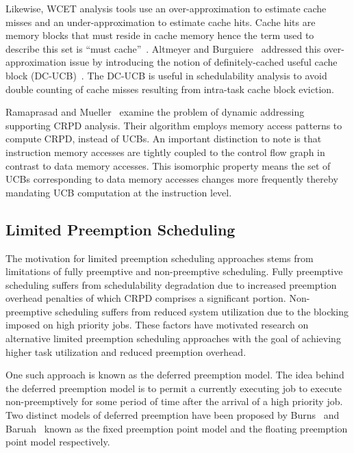 Likewise, WCET analysis tools use an over-approximation to estimate cache misses and an under-approximation to estimate cache hits.  Cache hits are memory blocks that must reside in cache memory hence the term used to describe this set is “must cache”~\cite{altmeyer:11c}.  Altmeyer and Burguiere~\cite{altmeyer:11c} addressed this over-approximation issue by introducing the notion of definitely-cached useful cache block (DC-UCB)~\cite{altmeyer:11c}.  The DC-UCB is useful in schedulability analysis to avoid double counting of cache misses resulting from intra-task cache block eviction.

Ramaprasad and Mueller~\cite{ramaprasad:06} examine the problem of dynamic addressing supporting CRPD analysis. Their algorithm employs memory access patterns to compute CRPD, instead of UCBs.  An important distinction to note is that instruction memory accesses are tightly coupled to the control flow graph in contrast to data memory accesses. This isomorphic property means the set of UCBs corresponding to data memory accesses changes more frequently thereby mandating UCB computation at the instruction level.
\subsection {Limited Preemption Scheduling}\label{sec:lp_related_work}
The motivation for limited preemption scheduling approaches stems from limitations of fully preemptive and non-preemptive scheduling.  Fully preemptive scheduling suffers from schedulability degradation due to increased preemption overhead penalties of which CRPD comprises a significant portion.  Non-preemptive scheduling suffers from reduced system utilization due to the blocking imposed on high priority jobs.  These factors have motivated research on alternative limited preemption scheduling approaches with the goal of achieving higher task utilization and reduced preemption overhead.

One such approach is known as the deferred preemption model.  The idea behind the deferred preemption model is to permit a currently executing job to execute non-preemptively for some period of time after the arrival of a high priority job.  Two distinct models of deferred preemption have been proposed by Burns~\cite{burns:05} and Baruah~\cite{baruah:05} known as the fixed preemption point model and the floating preemption point model respectively.

